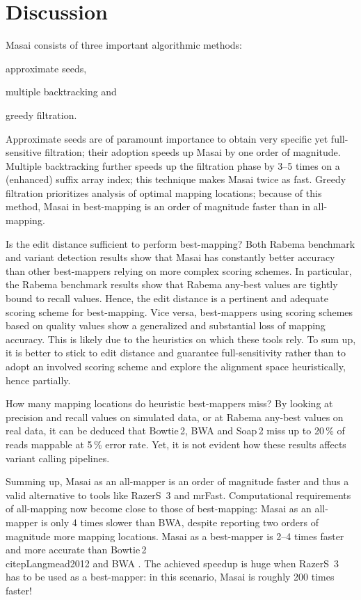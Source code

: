\section{Discussion}

Masai consists of three important algorithmic methods: \begin{inparaenum}[(i)]
\item approximate seeds,
\item multiple backtracking and
\item greedy filtration.
\end{inparaenum}
Approximate seeds are of paramount importance to obtain very specific yet full-sensitive filtration; their adoption speeds up Masai by one order of magnitude.
Multiple backtracking further speeds up the filtration phase by 3--5 times on a (enhanced) suffix array index; this technique makes Masai twice as fast.
Greedy filtration prioritizes analysis of optimal mapping locations; because of this method, Masai in best-mapping is an order of magnitude faster than in all-mapping.

Is the edit distance sufficient to perform best-mapping?
Both Rabema benchmark and variant detection results show that Masai has constantly better accuracy than other best-mappers relying on more complex scoring schemes.
In particular, the Rabema benchmark results show that Rabema any-best values are tightly bound to recall values.
Hence, the edit distance is a pertinent and adequate scoring scheme for best-mapping.
Vice versa, best-mappers using scoring schemes based on quality values show a generalized and substantial loss of mapping accuracy.
This is likely due to the heuristics on which these tools rely.
To sum up, it is better to stick to edit distance and guarantee full-sensitivity rather than to adopt an involved scoring scheme and explore the alignment space heuristically, hence partially.

How many mapping locations do heuristic best-mappers miss?
By looking at precision and recall values on simulated data, or at Rabema any-best values on real data, it can be deduced that Bowtie\,2, BWA and Soap\,2 miss up to 20\,\% of reads mappable at 5\,\% error rate.
Yet, it is not evident how these results affects variant calling pipelines.

Summing up, Masai as an all-mapper is an order of magnitude faster and thus a valid alternative to tools like RazerS~3 and mrFast.
Computational requirements of all-mapping now become close to those of best-mapping: Masai as an all-mapper is only 4 times slower than BWA, despite reporting two orders of magnitude more mapping locations.
Masai as a best-mapper is 2--4 times faster and more accurate than Bowtie\,2 \\citep{Langmead2012} and BWA \citep{Li2009}.
The achieved speedup is huge when RazerS~3 has to be used as a best-mapper: in this scenario, Masai is roughly 200 times faster!


